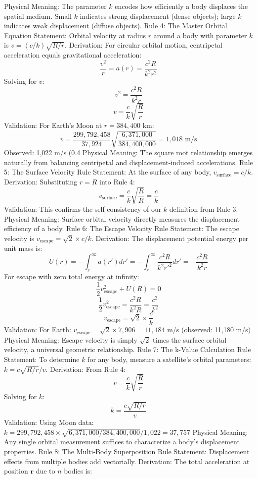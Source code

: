 Physical Meaning: The parameter $k$ encodes how efficiently a body displaces the spatial medium. Small $k$ indicates strong displacement (dense objects); large $k$ indicates weak displacement (diffuse objects).
Rule 4: The Master Orbital Equation
Statement: Orbital velocity at radius $r$ around a body with parameter $k$ is $v = (c/k)\sqrt{R/r}$.
Derivation: For circular orbital motion, centripetal acceleration equals gravitational acceleration:
$$\frac{v^2}{r} = a(r) = \frac{c^2R}{k^2r^2}$$
Solving for $v$:
$$v^2 = \frac{c^2R}{k^2r}$$
$$v = \frac{c}{k}\sqrt{\frac{R}{r}}$$
Validation: For Earth's Moon at $r = 384,400$ km: $$v = \frac{299,792,458}{37,924}\sqrt{\frac{6,371,000}{384,400,000}} = 1,018 \text{ m/s}$$ Observed: 1,022 m/s (0.4%
Physical Meaning: The square root relationship emerges naturally from balancing centripetal and displacement-induced accelerations.
Rule 5: The Surface Velocity Rule
Statement: At the surface of any body, $v_{\text{surface}} = c/k$.
Derivation: Substituting $r = R$ into Rule 4:
$$v_{\text{surface}} = \frac{c}{k}\sqrt{\frac{R}{R}} = \frac{c}{k}$$
Validation: This confirms the self-consistency of our $k$ definition from Rule 3.
Physical Meaning: Surface orbital velocity directly measures the displacement efficiency of a body.
Rule 6: The Escape Velocity Rule
Statement: The escape velocity is $v_{\text{escape}} = \sqrt{2} \times c/k$.
Derivation: The displacement potential energy per unit mass is:
$$U(r) = -\int_r^{\infty} a(r')dr' = -\int_r^{\infty} \frac{c^2R}{k^2r'^2}dr' = -\frac{c^2R}{k^2r}$$
For escape with zero total energy at infinity:
$$\frac{1}{2}v_{\text{escape}}^2 + U(R) = 0$$
$$\frac{1}{2}v_{\text{escape}}^2 = \frac{c^2R}{k^2R} = \frac{c^2}{k^2}$$
$$v_{\text{escape}} = \sqrt{2} \times \frac{c}{k}$$
Validation: For Earth: $v_{\text{escape}} = \sqrt{2} \times 7,906 = 11,184$ m/s (observed: 11,180 m/s)
Physical Meaning: Escape velocity is simply $\sqrt{2}$ times the surface orbital velocity, a universal geometric relationship.
Rule 7: The k-Value Calculation Rule
Statement: To determine $k$ for any body, measure a satellite's orbital parameters: $k = c\sqrt{R/r}/v$.
Derivation: From Rule 4: $$v = \frac{c}{k}\sqrt{\frac{R}{r}}$$
Solving for $k$: $$k = \frac{c\sqrt{R/r}}{v}$$
Validation: Using Moon data: $k = 299,792,458 \times \sqrt{6,371,000/384,400,000}/1,022 = 37,757$
Physical Meaning: Any single orbital measurement suffices to characterize a body's displacement properties.
Rule 8: The Multi-Body Superposition Rule
Statement: Displacement effects from multiple bodies add vectorially.
Derivation: The total acceleration at position $\mathbf{r}$ due to $n$ bodies is:
